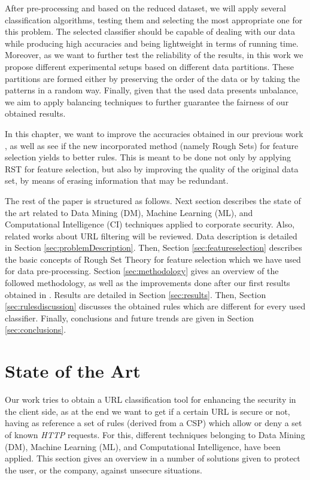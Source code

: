 \documentclass{llncs}
\begin{document}
After pre-processing and based on the reduced dataset, we will apply several classification algorithms, 
testing them and selecting the most appropriate one for this problem. The selected classifier should be capable 
of dealing with our data while producing high accuracies and
being lightweight in terms of running time. Moreover, as we want to further test the reliability of the results, 
in this work we propose different experimental setups based on different data
partitions. These partitions are formed either by preserving the order of the data or by taking the patterns in 
a random way. Finally, given that the used data presents unbalance, we aim to apply balancing 
techniques \cite{imbalance_techniques_02} to further guarantee the fairness of our obtained results.

In this chapter, we want to improve the accuracies obtained in our previous work \cite{ECTA}, 
as well as see if the new incorporated method (namely Rough Sets) for feature selection yields to better rules. 
This is meant to be done not only by applying RST for feature selection, but also by improving the quality of the 
original data set, by means of erasing information that may be redundant.

The rest of the paper is structured as follows. Next section describes the state of the art related 
to Data Mining (DM), Machine Learning (ML), and Computational Intelligence (CI) techniques applied 
to corporate security. Also, related works about URL filtering will be reviewed. Data  description is 
detailed in Section \ref{sec:problemDescription}. Then, Section \ref{sec:featureselection} describes the  
basic concepts of Rough Set Theory for feature selection which we  have used for data pre-processing. 
Section \ref{sec:methodology} gives an overview of the  followed methodology, as well as the improvements 
done after our  first results obtained in \cite{ECTA}. Results are detailed in Section \ref{sec:results}. 
Then, Section \ref{sec:rulesdiscussion}   discusses the  obtained rules which are different for every used 
classifier. Finally, conclusions and future trends are given in Section \ref{sec:conclusions}.

%
\section{State of the Art}
\label{sec:stateofart}

\noindent Our work tries to obtain a URL classification tool for
enhancing the security in the client side, as at the end we want to
get if a certain URL is secure or not, having as reference a set of
rules (derived from a CSP) which allow or deny a set of known
\textit{HTTP} requests. For this, different techniques belonging to Data Mining (DM), Machine
Learning (ML), and Computational Intelligence, have been applied. This section gives an
overview in a number of solutions given to protect the user, or the
company, against unsecure situations. 
\end{document}
